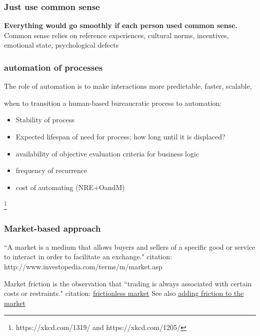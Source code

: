 \subsubsection{Just use common sense}
\textbf{Everything would go smoothly if each person used common sense.}\\
Common sense relies on reference experiences, cultural norms, incentives, emotional state, psychological defects


\subsubsection{automation of processes}

The role of automation is to make interactions more predictable, faster, scalable,

when to transition a human-based bureaucratic process to automation:
\begin{itemize}
    \item Stability of process
    \item Expected lifespan of need for process; how long until it is displaced?
\item availability of objective evaluation criteria for business logic
\item frequency of recurrence
\item cost of automating (NRE+OandM)
\end{itemize}

\footnote{https://xkcd.com/1319/ and https://xkcd.com/1205/}

\subsubsection{Market-based approach}

``A market is a medium that allows buyers and sellers of a specific good or service to interact in order to facilitate an exchange."
citation: http://www.investopedia.com/terms/m/market.asp

Market friction is the observation that ``trading is always associated with certain costs or restraints."
citation: \href{http://www.investopedia.com/terms/f/frictionlessmarket.asp}{frictionless market}
See also \href{https://insight.kellogg.northwestern.edu/article/adding_friction_to_the_market}{adding friction to the market}

